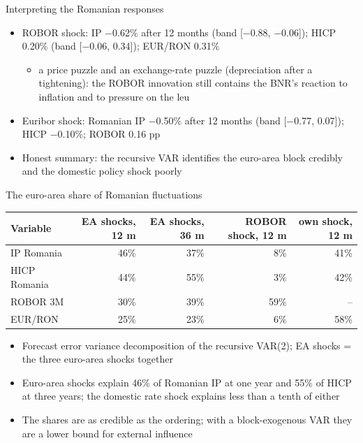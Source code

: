 \begin{frame}{Interpreting the Romanian responses}
\itemsize{\small}
\begin{itemize}
    \item ROBOR shock: IP \ensuremath{-}0.62\% after 12 months (band [\ensuremath{-}0.88, \ensuremath{-}0.06]); HICP 0.20\% (band [\ensuremath{-}0.06, 0.34]); EUR/RON 0.31\%
    \begin{itemize}
        \item a price puzzle and an exchange-rate puzzle (depreciation after a tightening): the ROBOR innovation still contains the BNR's reaction to inflation and to pressure on the leu
    \end{itemize}
    \item Euribor shock: Romanian IP \ensuremath{-}0.50\% after 12 months (band [\ensuremath{-}0.77, 0.07]); HICP \ensuremath{-}0.10\%; ROBOR 0.16 pp
    \item Honest summary: the recursive VAR identifies the euro-area block credibly and the domestic policy shock poorly
\end{itemize}
\end{frame}

\begin{frame}{The euro-area share of Romanian fluctuations}
\itemsize{\small}
\begin{center}
\scriptsize
\begin{tabular}{lrrrr}
\toprule
\textbf{Variable} & \textbf{EA shocks, 12 m} & \textbf{EA shocks, 36 m} & \textbf{ROBOR shock, 12 m} & \textbf{own shock, 12 m} \\
\midrule
IP Romania & 46\% & 37\% & 8\% & 41\% \\
HICP Romania & 44\% & 55\% & 3\% & 42\% \\
ROBOR 3M & 30\% & 39\% & 59\% & -- \\
EUR/RON & 25\% & 23\% & 6\% & 58\% \\
\bottomrule
\end{tabular}
\end{center}
\begin{itemize}
    \item Forecast error variance decomposition of the recursive VAR(2); EA shocks = the three euro-area shocks together
    \item Euro-area shocks explain 46\% of Romanian IP at one year and 55\% of HICP at three years; the domestic rate shock explains less than a tenth of either
    \item The shares are as credible as the ordering; with a block-exogenous VAR they are a lower bound for external influence
\end{itemize}
\end{frame}

